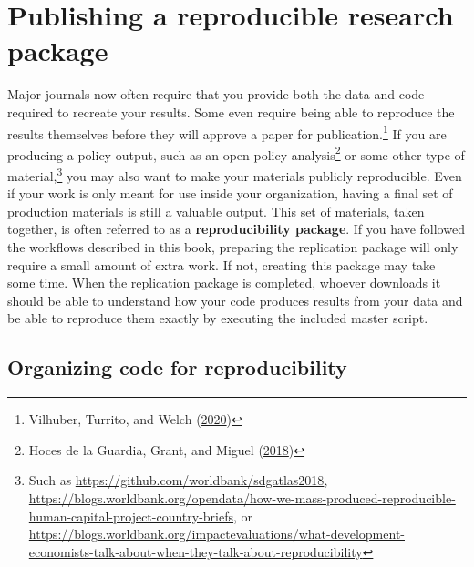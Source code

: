 \documentclass[
]{book}
\begin{document}
\hypertarget{publishing-a-reproducible-research-package}{%
\section*{Publishing a reproducible research package}\label{publishing-a-reproducible-research-package}}

Major journals now often require that you provide both the data and code required to recreate your results.
Some even require being able to reproduce the results themselves
before they will approve a paper for publication.\footnote{Vilhuber, Turrito, and Welch (\protect\hyperlink{ref-vilhuber2020report}{2020})}
If you are producing a policy output,
such as an open policy analysis\footnote{Hoces de la Guardia, Grant, and Miguel (\protect\hyperlink{ref-hoces2018framework}{2018})}
or some other type of material,\footnote{Such as \url{https://github.com/worldbank/sdgatlas2018},
  \url{https://blogs.worldbank.org/opendata/how-we-mass-produced-reproducible-human-capital-project-country-briefs},
  or \url{https://blogs.worldbank.org/impactevaluations/what-development-economists-talk-about-when-they-talk-about-reproducibility}}
you may also want to make your materials publicly reproducible.
Even if your work is only meant for use inside your organization,
having a final set of production materials is still a valuable output.
This set of materials, taken together,
is often referred to as a \textbf{reproducibility package}.
If you have followed the workflows described in this book,
preparing the replication package will only require a small amount of extra work.
If not, creating this package may take some time.
When the replication package is completed,
whoever downloads it should be able
to understand how your code produces results from your data
and be able to reproduce them exactly by executing the included master script.

\hypertarget{organizing-code-for-reproducibility}{%
\subsection*{Organizing code for reproducibility}\label{organizing-code-for-reproducibility}}
\end{document}
